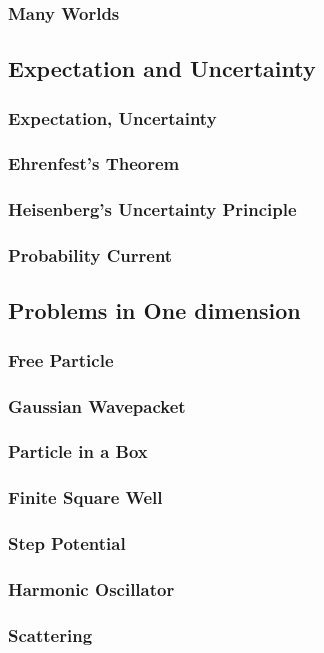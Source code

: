 \documentclass[a4paper]{article}
\begin{document}
\subsubsection{Many Worlds}
\subsection{Expectation and Uncertainty}
\subsubsection{Expectation, Uncertainty}
\subsubsection{Ehrenfest's Theorem}
\subsubsection{Heisenberg's Uncertainty Principle}
\subsubsection{Probability Current}
\subsection{Problems in One dimension}
\subsubsection{Free Particle}
\subsubsection{Gaussian Wavepacket}
\subsubsection{Particle in a Box}
\subsubsection{Finite Square Well}
\subsubsection{Step Potential}
\subsubsection{Harmonic Oscillator}
\subsubsection{Scattering}
\end{document}

